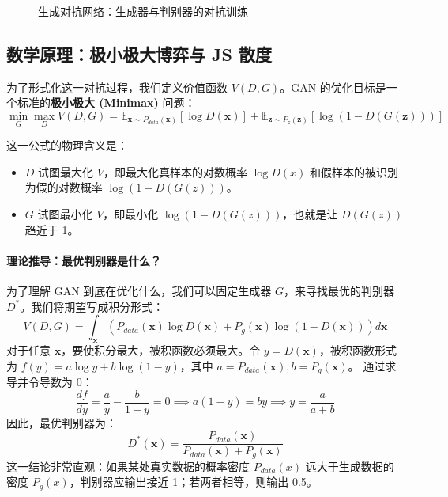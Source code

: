 \begin{figure}[H]
  \centering
  \resizebox{\textwidth}{!}{}
  \caption{生成对抗网络：生成器与判别器的对抗训练}
  \label{fig:ch09_orig24}
\end{figure}







\subsection{数学原理：极小极大博弈与 JS 散度}

为了形式化这一对抗过程，我们定义价值函数 $V(D, G)$。GAN 的优化目标是一个标准的\textbf{极小极大 (Minimax)} 问题：
\begin{equation}
    \min_G \max_D V(D, G) = \mathbb{E}_{\mathbf{x} \sim P_{data}(\mathbf{x})} [\log D(\mathbf{x})] + \mathbb{E}_{\mathbf{z} \sim P_{z}(\mathbf{z})} [\log(1 - D(G(\mathbf{z})))]
\end{equation}

这一公式的物理含义是：
\begin{itemize}
    \item $D$ 试图最大化 $V$，即最大化真样本的对数概率 $\log D(x)$ 和假样本的被识别为假的对数概率 $\log(1-D(G(z)))$。
    \item $G$ 试图最小化 $V$，即最小化 $\log(1-D(G(z)))$，也就是让 $D(G(z))$ 趋近于 1。
\end{itemize}

\paragraph{理论推导：最优判别器是什么？}
为了理解 GAN 到底在优化什么，我们可以固定生成器 $G$，来寻找最优的判别器 $D^*$。我们将期望写成积分形式：
\begin{equation}
    V(D, G) = \int_{\mathbf{x}} \left( P_{data}(\mathbf{x}) \log D(\mathbf{x}) + P_g(\mathbf{x}) \log(1 - D(\mathbf{x})) \right) d\mathbf{x}
\end{equation}
对于任意 $\mathbf{x}$，要使积分最大，被积函数必须最大。令 $y = D(\mathbf{x})$，被积函数形式为 $f(y) = a \log y + b \log(1-y)$，其中 $a=P_{data}(\mathbf{x}), b=P_g(\mathbf{x})$。
通过求导并令导数为 0：
\begin{equation}
    \frac{df}{dy} = \frac{a}{y} - \frac{b}{1-y} = 0 \implies a(1-y) = by \implies y = \frac{a}{a+b}
\end{equation}
因此，最优判别器为：
\begin{equation}
    D^*(\mathbf{x}) = \frac{P_{data}(\mathbf{x})}{P_{data}(\mathbf{x}) + P_g(\mathbf{x})}
\end{equation}
这一结论非常直观：如果某处真实数据的概率密度 $P_{data}(x)$ 远大于生成数据的密度 $P_g(x)$，判别器应输出接近 1；若两者相等，则输出 0.5。

